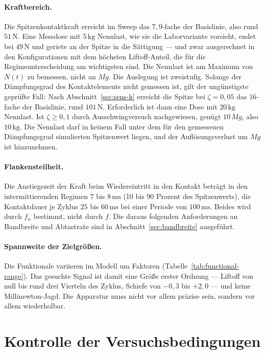 \documentclass[12pt,a4paper]{report}
\begin{document}
\paragraph{Kraftbereich.}
Die Spitzenkontaktkraft erreicht im Sweep das $7{,}9$-fache der
Basislinie, also rund $51\,\mathrm{N}$. Eine Messdose mit
$5\,\mathrm{kg}$ Nennlast, wie sie die Laborvariante vorsieht, endet bei
$49\,\mathrm{N}$ und geriete an der Spitze in die Sättigung --- und zwar
ausgerechnet in den Konfigurationen mit dem höchsten Liftoff-Anteil, die
für die Regimeunterscheidung am wichtigsten sind. Die Nennlast ist am
Maximum von $N(t)$ zu bemessen, nicht an $Mg$. Die Auslegung ist zweistufig. Solange der Dämpfungsgrad des
Kontaktelements nicht gemessen ist, gilt der ungünstigste geprüfte Fall:
Nach Abschnitt~\ref{sec:sens-k} erreicht die Spitze bei
$\zeta = 0{,}05$ das $16$-fache der Basislinie, rund $101\,\mathrm{N}$.
Erforderlich ist dann eine Dose mit $20\,\mathrm{kg}$ Nennlast. Ist
$\zeta \geq 0{,}1$ durch Ausschwingversuch nachgewiesen, genügt
$10\,Mg$, also $10\,\mathrm{kg}$. Die Nennlast darf in keinem Fall
unter dem für den gemessenen Dämpfungsgrad simulierten Spitzenwert
liegen, und der Auflösungsverlust um $Mg$ ist hinzunehmen.

\paragraph{Flankensteilheit.}
Die Anstiegszeit der Kraft beim Wiedereintritt in den Kontakt beträgt
in den intermittierenden Regimen $7$ bis $8\,\mathrm{ms}$ (10 bis
90 Prozent des Spitzenwerts), die Kontaktdauer je Zyklus $25$ bis
$60\,\mathrm{ms}$ bei einer Periode von $100\,\mathrm{ms}$. Beides wird
durch $f_n$ bestimmt, nicht durch $f$. Die daraus folgenden
Anforderungen an Bandbreite und Abtastrate sind in
Abschnitt~\ref{sec:bandbreite} ausgeführt.

\paragraph{Spannweite der Zielgrößen.}
Die Funktionale variieren im Modell um Faktoren
(Tabelle~\ref{tab:functional-range}). Das gesuchte Signal ist damit
eine Größe erster Ordnung --- Liftoff von null bis rund drei Vierteln
des Zyklus, Schiefe von $-0{,}3$ bis $+2{,}0$ --- und keine
Millinewton-Jagd. Die Apparatur muss nicht vor allem präzise sein,
sondern vor allem wiederholbar.

\section{Kontrolle der Versuchsbedingungen}
\end{document}
